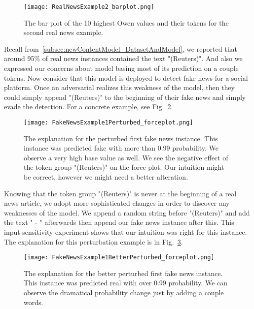 \begin{figure}
    \centering
    \texttt{[image: RealNewsExample2\_barplot.png]}
    \caption[The bar plot of the 10 highest Owen values and their tokens for the second real news example.]{The bar plot of the 10 highest Owen values and their tokens for the second real news example.}
    \label{fig:RealNewsExample2_barplot}
\end{figure}
Recall from~\ref{subsec:newContentModel_DatasetAndModel}, we reported that around 95\% of real news instances contained the text "(Reuters)". And also we expressed our concerns about model basing most of its prediction on a couple tokens. Now consider that this model is deployed to detect fake news for a social platform. Once an adversarial realizes this weakness of the model, then they could simply append "(Reuters)" to the beginning of their fake news and simply evade the detection. For a concrete example, see Fig.~\ref{fig:FakeNewsExample1Perturbed_forceplot}.\\
\begin{figure}
    \centering
    \texttt{[image: FakeNewsExample1Perturbed\_forceplot.png]}
    \caption[The explanation for the perturbed first fake news instance.]{The explanation for the perturbed first fake news instance. This instance was predicted fake with more than 0.99 probability. We observe a very high base value as well. We see the negative effect of the token group "(Reuters)" on the force plot. Our intuition might be correct, however we might need a better alteration.}
    \label{fig:FakeNewsExample1Perturbed_forceplot}
\end{figure}
Knowing that the token group "(Reuters)" is never at the beginning of a real news article, we adopt more sophisticated changes in order to discover any weaknesses of the model. We append a random string before "(Reuters)" and add the text " - " afterwards then append our fake news instance after this. This input sensitivity experiment shows that our intuition was right for this instance. The explanation for this perturbation example is in Fig.~\ref{fig:FakeNewsExample1BetterPerturbed_forceplot}.\\
\begin{figure}
    \centering
    \texttt{[image: FakeNewsExample1BetterPerturbed\_forceplot.png]}
    \caption[The explanation for the better perturbed first fake news instance.]{The explanation for the better perturbed first fake news instance. This instance was predicted real with over 0.99 probability. We can observe the dramatical probability change just by adding a couple words.}
    \label{fig:FakeNewsExample1BetterPerturbed_forceplot}
\end{figure}
